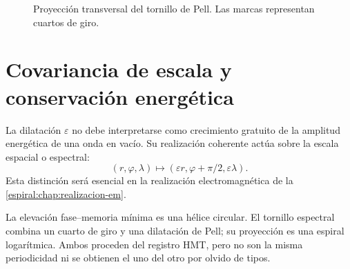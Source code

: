 \begin{figure}[htbp]
\centering
{}
\caption{Proyección transversal del tornillo de Pell. Las marcas representan cuartos de giro.}
\label{espiral:fig:tornillo-pell}
\end{figure}

\section{Covariancia de escala y conservación energética}

La dilatación \(\varepsilon\) no debe interpretarse como crecimiento
gratuito de la amplitud energética de una onda en vacío. Su realización
coherente actúa sobre la escala espacial o espectral:
\[
 (r,\varphi,\lambda)
 \longmapsto
 (\varepsilon r,\varphi+\pi/2,\varepsilon\lambda).
\]
Esta distinción será esencial en la realización electromagnética de la
\cref{espiral:chap:realizacion-em}.

\begin{resultbox}[title={Compatibilidad exacta entre el tornillo espectral de Pell y la suspensión fase--memoria}]
La elevación fase--memoria mínima es una hélice circular. El tornillo
espectral combina un cuarto de giro y una dilatación de Pell; su proyección
es una espiral logarítmica. Ambos proceden del registro HMT, pero no son la
misma periodicidad ni se obtienen el uno del otro por olvido de tipos.
\end{resultbox}
